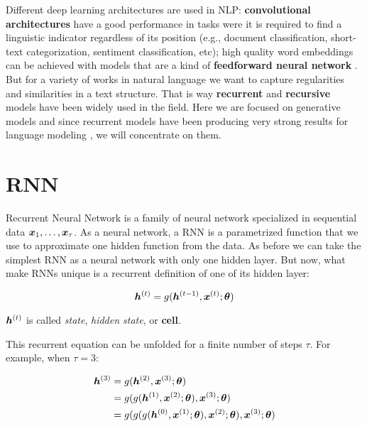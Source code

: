 Different deep learning architectures are used in NLP: \textbf{convolutional architectures} have a good performance in tasks were it is required to find a linguistic indicator regardless of its position (e.g., document classification, short-text categorization, sentiment classification, etc); high quality word embeddings can be achieved with models that are a kind of \textbf{feedforward neural network} \cite{Mikolov23}. But for a variety of works in natural language we want to capture regularities and similarities in a text structure. That is way \textbf{recurrent} and \textbf{recursive} models have been widely used in the field. Here we are focused on generative models and since recurrent models have been producing very strong results for language modeling \cite{goldberg15}, we will concentrate on them.

\section{RNN}
\label{sec:RNN}


Recurrent Neural Network is a family of neural network specialized in sequential data $\bm{x}_1, \dots, \bm{x}_\tau$. As a neural network, a RNN is a parametrized function that we use to approximate one hidden function from the data. As before we can take the simplest RNN as a neural network with only one hidden layer. But now, what make RNNs unique is a recurrent definition of one of its hidden layer:

\begin{equation}
\bm{h}^{(t)} = g(\bm{h}^{(t-1)}, \bm{x}^{(t)}; \bm{\theta})
\end{equation}

$\bm{h}^{(t)}$ is called \textit{state}, \textit{hidden state}, or \textbf{cell}.


\par This recurrent equation can be unfolded for a finite number of steps $\tau$. For example, when $\tau =3$:
\vspace{0.2cm}

\begin{align}
\bm{h}^{(3)}& = g(\bm{h}^{(2)}, \bm{x}^{(3)}; \bm{\theta})\\
 & = g(g(\bm{h}^{(1)}, \bm{x}^{(2)}; \bm{\theta}), \bm{x}^{(3)}; \bm{\theta})\\
 & = g(g(g(\bm{h}^{(0)}, \bm{x}^{(1)}; \bm{\theta}), \bm{x}^{(2)}; \bm{\theta}), \bm{x}^{(3)}; \bm{\theta})\\
\end{align}


